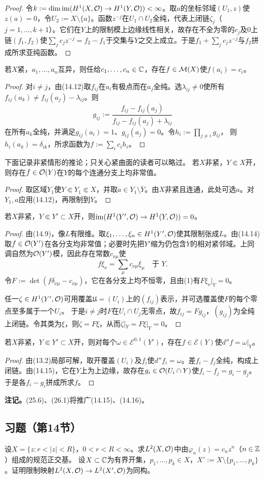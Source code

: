 \begin{proof}
令$k:=\dim\operatorname{im}(H^1(X,\mathcal O)\to H^1(Y,\mathcal O))<\infty$。取$a$的坐标邻域$(U_1,z)$使$z(a)=0$，令$U_2:=X\setminus\{a\}$。函数$z^{-j}$在$U_1\cap U_2$全纯，代表上闭链$\zeta_j$（$j=1,\ldots,k+1$）。它们在$Y$上的限制模上边缘线性相关，故存在不全为零的$c_j$及0上链$(f_1,f_2)$使$\sum_jc_jz^{-j}=f_2-f_1$于交集与$Y$之交上成立。于是$f_1+\sum_jc_jz^{-j}$与$f_2$拼成所求亚纯函数。
\end{proof}
若$X$紧，$a_1,\ldots,a_n$互异，则任给$c_1,\ldots,c_n\in\mathbb C$，存在$f\in\mathcal M(X)$使$f(a_i)=c_i$。
\begin{proof}
对$i\ne j$，由(14.12)取$f_{ij}$在$a_i$有极点而在$a_j$全纯。选$\lambda_{ij}\ne0$使所有$f_{ij}(a_k)\ne f_{ij}(a_j)-\lambda_{ij}$。则
\[
g_{ij}:=\frac{f_{ij}-f_{ij}(a_j)}{f_{ij}-f_{ij}(a_j)+\lambda_{ij}}
\]
在所有$a_k$全纯，并满足$g_{ij}(a_i)=1$、$g_{ij}(a_j)=0$。令$h_i:=\prod_{j\ne i}g_{ij}$，
则$h_i(a_k)=\delta_{ik}$，所求函数为$f:=\sum_ic_ih_i$。
\end{proof}
下面记录非紧情形的推论；只关心紧曲面的读者可以略过。
若$X$非紧，$Y\Subset X$开，则存在$f\in\mathcal O(Y)$在$Y$的每个连通分支上均非常值。
\begin{proof}
取区域$Y_1$使$Y\Subset Y_1\Subset X$，并取$a\in Y_1\setminus\overline Y$。由$X$非紧且连通，此处可选$a$。对$Y_1,a$应用(14.12)，再限制到$Y$。
\end{proof}
若$X$非紧，$Y\Subset Y'\subset X$开，则$\operatorname{im}(H^1(Y',\mathcal O)\to H^1(Y,\mathcal O))=0$。
\begin{proof}
由(14.9)，像$L$有限维。取$\xi_1,\ldots,\xi_n\in H^1(Y',\mathcal O)$使其限制张成$L$。由(14.14)取$f\in\mathcal O(Y')$在各分支均非常值；必要时先把$Y'$缩为仍包含$\overline Y$的相对紧邻域。上同调自然为$\mathcal O(Y')$模，因此存在常数$c_{\nu\mu}$使
\begin{equation}f\xi_\nu=\sum_\mu c_{\nu\mu}\xi_\mu\quad\text{于 }Y.\tag{1}\end{equation}
令$F:=\det(f\delta_{\nu\mu}-c_{\nu\mu})$，它在各分支上均不恒零，且由(1)有$F\xi_\nu|_Y=0$。

任一$\zeta\in H^1(Y',\mathcal O)$可用覆盖$\mathfrak U=(U_i)$上的$(f_{ij})$表示，并可选覆盖使$F$的每个零点至多属于一个$U_i$。
于是$i\ne j$时$F$在$U_i\cap U_j$无零点，故$f_{ij}=Fg_{ij}$，$(g_{ij})$为全纯上闭链。令其类为$\xi$，则$\zeta=F\xi$，从而$\zeta|_Y=F\xi|_Y=0$。
\end{proof}
若$X$非紧，$Y\Subset Y'\subset X$开，则对每个$\omega\in\mathcal E^{0,1}(Y')$，存在$f\in\mathcal E(Y)$使$d''f=\omega|_Y$。
\begin{proof}
由(13.2)局部可解，取开覆盖$(U_i)$及$f_i$使$d''f_i=\omega$。差$f_i-f_j$全纯，构成上闭链。由(14.15)，它在$Y$上为上边缘，故存在$g_i\in\mathcal O(U_i\cap Y)$使$f_i-f_j=g_i-g_j$。于是各$f_i-g_i$拼成所求$f$。
\end{proof}
\textbf{注记。}(25.6)、(26.1)将推广(14.15)、(14.16)。
\subsection*{习题（第14节）}
设$X=\{z:r<|z|<R\}$，$0<r<R<\infty$。求$L^2(X,\mathcal O)$中由$\varphi_n(z)=c_nz^n$（$n\in\mathbb Z$）组成的规范正交基。
设$X\subset\mathbb C$为有界开集，$p_1,\ldots,p_k\in X$，$X':=X\setminus\{p_1,\ldots,p_k\}$。证明限制映射$L^2(X,\mathcal O)\to L^2(X',\mathcal O)$为同构。
